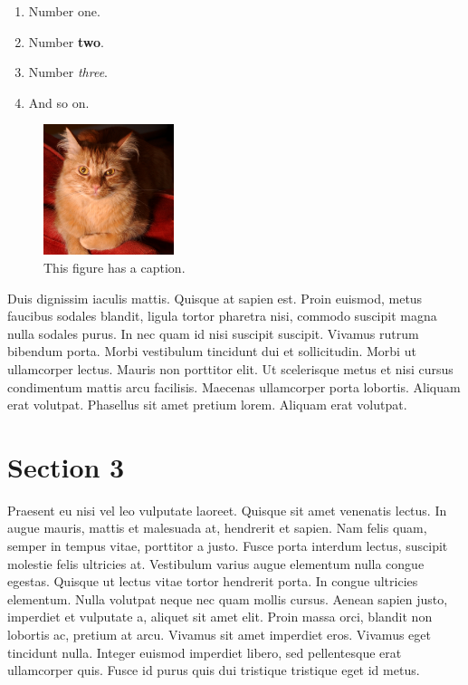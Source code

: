 \documentclass[letterpaper,10pt,twocolumn]{article}
\begin{document}
\begin{enumerate}
  \item{Number one.}
  \item{Number \textbf{two}.}
  \item{Number \emph{three}.}
  \item{And so on.}
\end{enumerate}
\begin{figure}
\begin{center}
\includegraphics[width=1.5in]{fritz}
\caption{This figure has a caption.}
\label{fig:f1}
\end{center}
\end{figure}

Duis dignissim iaculis mattis. Quisque at sapien est. Proin euismod, metus faucibus sodales blandit, ligula tortor pharetra nisi, commodo suscipit magna nulla sodales purus. In nec quam id nisi suscipit suscipit. Vivamus rutrum bibendum porta. Morbi vestibulum tincidunt dui et sollicitudin. Morbi ut ullamcorper lectus. Mauris non porttitor elit. Ut scelerisque metus et nisi cursus condimentum mattis arcu facilisis. Maecenas ullamcorper porta lobortis. Aliquam erat volutpat. Phasellus sit amet pretium lorem. Aliquam erat volutpat.

\section{Section 3}
Praesent eu nisi vel leo vulputate laoreet. Quisque sit amet venenatis lectus. In augue mauris, mattis et malesuada at, hendrerit et sapien. Nam felis quam, semper in tempus vitae, porttitor a justo. Fusce porta interdum lectus, suscipit molestie felis ultricies at. Vestibulum varius augue elementum nulla congue egestas. Quisque ut lectus vitae tortor hendrerit porta. In congue ultricies elementum. Nulla volutpat neque nec quam mollis cursus. Aenean sapien justo, imperdiet et vulputate a, aliquet sit amet elit. Proin massa orci, blandit non lobortis ac, pretium at arcu. Vivamus sit amet imperdiet eros. Vivamus eget tincidunt nulla. Integer euismod imperdiet libero, sed pellentesque erat ullamcorper quis. Fusce id purus quis dui tristique tristique eget id metus.
\end{document}
